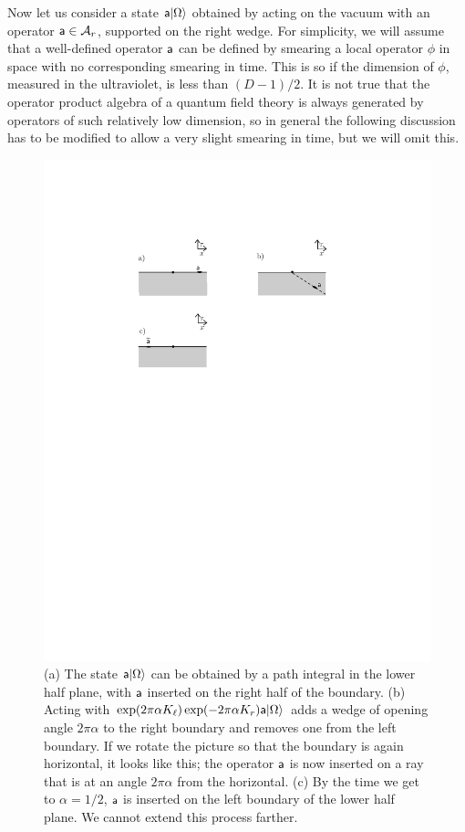 \documentclass[12pt]{article}
\def\a{{\sf a}}
\def\ra{\rangle}
\numberwithin{equation}{section}
\def\A{{\mathcal A}}
\begin{document}
 Now let us consider a state $\a|\Omega\ra$ obtained by acting on the vacuum with an operator $\a\in\A_r$, supported on the
 right wedge.    For simplicity, we will assume that a well-defined operator $\a$ can be defined by smearing a local operator $\phi$
 in space with no corresponding smearing in time.    This is so if the dimension of $\phi$, measured in the ultraviolet, is less than
 $(D-1)/2$.   It is not true that the operator product algebra of a quantum field theory is always generated by operators of such
 relatively low dimension, so in general the following discussion has to be modified to allow a very slight smearing in time, but we will
 omit this.
  
  \begin{figure}
 \begin{center}
   \includegraphics[width=5.5in]{Fig4.pdf}
 \end{center}
\caption{\small   (a) The state $\a|\Omega\ra$ can be obtained by a path integral in the lower half plane, with $\a$ inserted
 on the right half of the boundary.  (b)   Acting with $\exp(2\pi \alpha K_\ell) \exp(-2\pi \alpha K_r) \a|\Omega\ra$
 adds a wedge of opening angle $2\pi\alpha$ to the right boundary and removes one from the left boundary.
 If we rotate the picture so that the boundary is again horizontal, it looks like this; the operator $\a$ is now inserted
 on a ray that is at an angle $2\pi \alpha$ from the horizontal.  (c) By the time we get to $\alpha=1/2$, $\a$ is
 inserted on the left boundary of the lower half plane.  We cannot extend this process farther.\label{Fig4}}
\end{figure}
  
\end{document}
